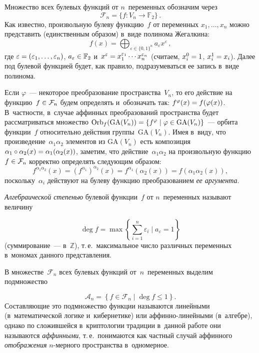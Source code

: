 \begin{multicols}{2}
Множество всех булевых функций от $n$~переменных обозначим через
$$
\mathcal{F}_n=\{f\colon V_n\to \mathbb{F}_2\}\,.
$$
Как известно, произвольную булеву функцию~$f$ от переменных $x_1,\ldots,x_n$ 
можно представить (единственным образом) в~виде полинома Жегалкина:
$$
f(x)=\bigoplus_{\varepsilon\in\{0,1\}^n} a_{\varepsilon}x^{\varepsilon}\,,
$$
где %
$\varepsilon\hm=(\varepsilon_1,\ldots,\varepsilon_n)$,
$a_{\varepsilon}\hm\in\mathbb{F}_2$ и~$x^{\varepsilon}\hm=x_1^{\varepsilon_1}\cdots x_n^{\varepsilon_n}$ (считаем, 
$x_i^0\hm=1$, $x_i^1\hm=x_i$).
Далее под булевой функцией будет, как правило, подразумеваться ее запись в~виде 
полинома.

Если $\varphi$~--- некоторое преобразование пространства~$V_n$, то его действие на 
функцию~$f\hm\in\mathcal{F}_n$ будем определять и~обозначать так: 
$f^{\varphi}(x)\hm=f(\varphi(x))$.
В~частности, в~случае аффинных преобразований пространства будет рассматриваться 
множество $\mathrm{Orb}_f(\mathrm{GA}(V_n))\hm=\{f^{\varphi}\mid 
\varphi\hm\in\mathrm{GA}(V_n)\}$~--- орбита функции~$f$ относительно действия 
группы~$\mathrm{GA}(V_n)$.
Имея в~виду, что произведение~$\alpha_1\alpha_2$ элементов из $\mathrm{GA}(V_n)$ 
есть композиция $\alpha_1\circ\alpha_2(x)\hm=\alpha_1(\alpha_2(x))$, заметим, что 
действие~$\alpha_1\alpha_2$ на произвольную функцию $f\hm\in\mathcal{F}_n$ 
корректно определять следующим образом:
$$
f^{\alpha_1\alpha_2}(x)=\left(f^{\alpha_1}\right)^{\alpha_2}(x)=f^{\alpha_1}
\left(\alpha_2(x)\right)
=f\left(\alpha_1\alpha_2(x)\right),
$$
поскольку~$\alpha_i$ действуют на булеву функцию преобразованием \textit{ее 
аргумента}.



\textit{Алгебраической степенью} булевой функции~$f$ от $n$~переменных называют 
величину

\noindent
$$
\deg f = \max\left\{\sum\limits_{i=1}^n \varepsilon_i\mid a_{\varepsilon}=1\right\}
$$
(суммирование~--- в~$\mathbb{Z}$), т.\,е.\ максимальное число различных 
переменных в~мономах данного представления.

В множестве~$\mathcal{F}_n$ всех булевых функций от~$n$~переменных выделим 
подмножество

\noindent
$$
\mathcal{A}_n=\left\{f\in\mathcal{F}_n\mid \deg f\leqslant 1\right\}.
$$
Составляющие это подмножество функции называются линейными (в~математической 
логике и~кибернетике) или аф\-фин\-но-ли\-ней\-ны\-ми (в~ал\-геб\-ре), однако по сложившейся 
в~криптологии традиции в~данной работе они называются \textit{аффинными}, т.\,е.\ 
понимаются как частный случай аффинного \textit{отоб\-ра\-же\-ния} $n$-мер\-но\-го 
пространства в~одномерное.



\end{multicols}
